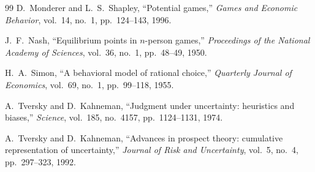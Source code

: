 \documentclass[11pt]{article}
\theoremstyle{definition}
\theoremstyle{remark}
\begin{document}
\begin{thebibliography}{99}
D.~Monderer and L.~S.~Shapley, ``Potential games,'' \emph{Games and Economic Behavior}, vol.~14,
no.~1, pp.~124--143, 1996.

J.~F.~Nash, ``Equilibrium points in $n$-person games,'' \emph{Proceedings of the National Academy of
Sciences}, vol.~36, no.~1, pp.~48--49, 1950.

H.~A.~Simon, ``A behavioral model of rational choice,'' \emph{Quarterly Journal of Economics},
vol.~69, no.~1, pp.~99--118, 1955.

A.~Tversky and D.~Kahneman, ``Judgment under uncertainty: heuristics and biases,'' \emph{Science},
vol.~185, no.~4157, pp.~1124--1131, 1974.

A.~Tversky and D.~Kahneman, ``Advances in prospect theory: cumulative representation of uncertainty,''
\emph{Journal of Risk and Uncertainty}, vol.~5, no.~4, pp.~297--323, 1992.

\end{thebibliography}
\end{document}
